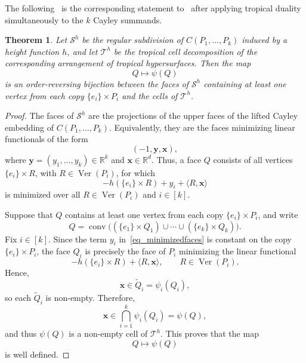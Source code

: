 \documentclass[12pt, reqno]{amsart}
\theoremstyle{plain}
\newtheorem{theorem}{Theorem}[section]
\theoremstyle{definition}
\numberwithin{equation}{section}
\begin{document}
The following~ is the corresponding statement to~ after applying tropical duality simultaneously to the \(k\) Cayley summands.

\begin{theorem}\label{thm_Cayley_tropicalArrangement}
Let $\mathcal{S}^h$ be the regular subdivision of $C(P_1,\ldots,P_k)$ induced by a height function $h$, and let $\mathscr{T}^h$ be the tropical cell decomposition of the corresponding arrangement of tropical hypersurfaces. Then the map
\[
Q\longmapsto\psi(Q)
\]
is an order-reversing bijection between the faces of $\mathcal{S}^h$ containing at least one vertex from each copy $\{e_i\}\times P_i$ and the cells of $\mathscr{T}^h$.
\end{theorem}

\begin{proof}
The faces of $\mathcal{S}^h$ are the projections of the upper faces of the lifted Cayley embedding of $C(P_1,\dots,P_k)$. Equivalently, they are the faces minimizing linear functionals of the form
\[
(-1,\mathbf{y},\mathbf{x}),
\]
where $\mathbf{y}=(y_1,\dots,y_k)\in\mathbb{R}^k$ and $\mathbf{x}\in\mathbb{R}^d$. Thus, a face $Q$ consists of all vertices $\{e_i\}\times R$, with $R\in\operatorname{Ver}(P_i)$, for which
\begin{equation}\label{eq_minimizedfaces}
-h(\{e_i\}\times R)+y_i+\langle R,\mathbf{x}\rangle
\end{equation}
is minimized over all $R\in\operatorname{Ver}(P_i)$ and $i\in[k]$.

Suppose that $Q$ contains at least one vertex from each copy $\{e_i\}\times P_i$, and write
\[
Q=
\operatorname{conv}\bigl((\{e_1\}\times Q_1)\cup\cdots\cup(\{e_k\}\times Q_k)\bigr).
\]
Fix $i\in[k]$. Since the term $y_i$ in~\eqref{eq_minimizedfaces} is constant on the copy $\{e_i\}\times P_i$, the face $Q_i$ is precisely the face of $P_i$ minimizing the linear functional
\[
-h(\{e_i\}\times R)+\langle R,\mathbf{x}\rangle,
\qquad
R\in\operatorname{Ver}(P_i).
\]
Hence,
\[
\mathbf{x}\in\tilde Q_i=\psi_i(Q_i),
\]
so each $\tilde Q_i$ is non-empty. Therefore,
\[
\mathbf{x}\in\bigcap_{i=1}^k\psi_i(Q_i)
=\psi(Q),
\]
and thus $\psi(Q)$ is a non-empty cell of $\mathscr{T}^h$. This proves that the map
\[
Q\longmapsto\psi(Q)
\]
is well defined.


\end{proof}
\end{document}
